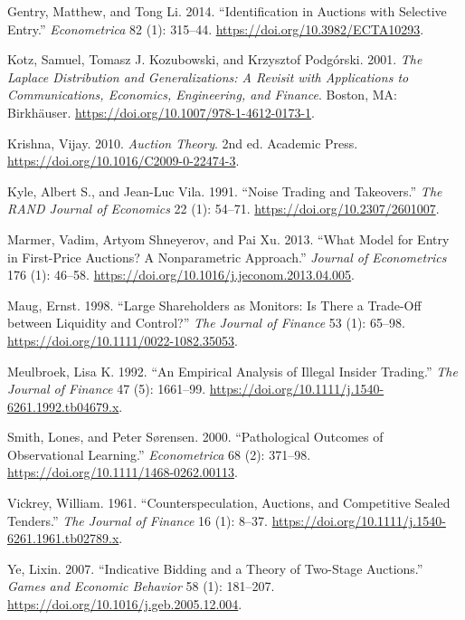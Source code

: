 Gentry, Matthew, and Tong Li. 2014. {``Identification in Auctions with
Selective Entry.''} \emph{Econometrica} 82 (1): 315--44.
\url{https://doi.org/10.3982/ECTA10293}.

Kotz, Samuel, Tomasz J. Kozubowski, and Krzysztof Podg\'orski. 2001.
\emph{The Laplace Distribution and Generalizations: A Revisit with
Applications to Communications, Economics, Engineering, and Finance}.
Boston, MA: Birkh\"auser.
\url{https://doi.org/10.1007/978-1-4612-0173-1}.

Krishna, Vijay. 2010. \emph{Auction Theory}. 2nd ed. Academic Press.
\url{https://doi.org/10.1016/C2009-0-22474-3}.

Kyle, Albert S., and Jean-Luc Vila. 1991. {``Noise Trading and
Takeovers.''} \emph{The RAND Journal of Economics} 22 (1): 54--71.
\url{https://doi.org/10.2307/2601007}.

Marmer, Vadim, Artyom Shneyerov, and Pai Xu. 2013. {``What Model for
Entry in First-Price Auctions? A Nonparametric Approach.''}
\emph{Journal of Econometrics} 176 (1): 46--58.
\url{https://doi.org/10.1016/j.jeconom.2013.04.005}.

Maug, Ernst. 1998. {``Large Shareholders as Monitors: Is There a
Trade-Off between Liquidity and Control?''} \emph{The Journal of
Finance} 53 (1): 65--98.
\url{https://doi.org/10.1111/0022-1082.35053}.

Meulbroek, Lisa K. 1992. {``An Empirical Analysis of Illegal Insider
Trading.''} \emph{The Journal of Finance} 47 (5): 1661--99.
\url{https://doi.org/10.1111/j.1540-6261.1992.tb04679.x}.

Smith, Lones, and Peter S{\o}rensen. 2000. {``Pathological Outcomes of
Observational Learning.''} \emph{Econometrica} 68 (2): 371--98.
\url{https://doi.org/10.1111/1468-0262.00113}.

Vickrey, William. 1961. {``Counterspeculation, Auctions, and
Competitive Sealed Tenders.''} \emph{The Journal of Finance} 16 (1):
8--37. \url{https://doi.org/10.1111/j.1540-6261.1961.tb02789.x}.

Ye, Lixin. 2007. {``Indicative Bidding and a Theory of Two-Stage
Auctions.''} \emph{Games and Economic Behavior} 58 (1): 181--207.
\url{https://doi.org/10.1016/j.geb.2005.12.004}.
